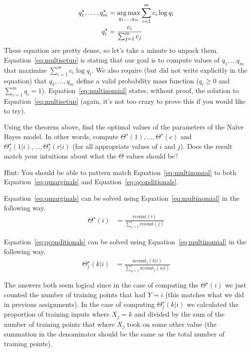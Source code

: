\documentclass[assignment04_Solutions]{subfiles}
\begin{document}
\begin{exercise}[(60 minutes)]
\begin{align}
q^\star_1, \ldots, q^\star_m &= \operatorname*{arg\,max}_{q_1, \ldots, q_m} \sum_{i=1}^m c_i \log q_i \label{eq:multisetup} \\
q^\star_i &= \frac{c_i}{\sum_{j=1}^m c_j} \label{eq:multinomial}
\end{align}
These equation are pretty dense, so let's take a minute to unpack them.  Equation~\ref{eq:multisetup} is stating that our goal is to compute values of $q_1, \ldots q_m$ that maximize $\sum_{i=1}^m c_i \log q_i$.  We also require (but did not write explicitly in the equation) that $q_1, \ldots, q_m$ define a valid probability mass function ($q_i \geq 0$ and $\sum_{i=1}^m q_i = 1$).  Equation~\ref{eq:multinomial} states, without proof, the solution to Equation~\ref{eq:multisetup} (again, it's not too crazy to prove this if you would like to try).

Using the theorem above, find the optimal values of the parameters of the Na\"ive Bayes model.  In other words, compute $\Theta^\star(1), \ldots, \Theta^\star(c)$ and $\Theta_j^\star(1|i), \ldots, \Theta^\star_j(r|i)$ (for all appropriate values of $i$ and $j$).  Does the result match your intuitions about what the $\Theta$ values should be?

Hint: You should be able to pattern match Equation~\ref{eq:multinomial} to both Equation~\ref{eq:qmarginals} and Equation~\ref{eq:qconditionals}. 

\begin{boxedsolution}
Equation~\ref{eq:qmarginals} can be solved using Equation~\ref{eq:multinomial} in the following way.
\begin{align}
\Theta^\star(i) &= \frac{\mbox{ycount}(i)}{\sum_{j=1}^c \mbox{ycount}(j)}
\end{align}

Equation~\ref{eq:qconditionals} can be solved using Equation~\ref{eq:multinomial} in the following way.
\begin{align}
\Theta_j^\star(k|i) &= \frac{\mbox{xcount}_j(k|i)}{\sum_{u=1}^r \mbox{xcount}_j(u|i)}
\end{align}

The answers both seem logical since in the case of computing the $\Theta^\star(i)$ we just counted the number of training points that had $Y=i$ (this matches what we did in previous assignments).  In the case of computing $\Theta^\star_j(k|i)$ we calculated the proportion of training inputs where $X_j = k$ and divided by the sum of the number of training points that where $X_j$ took on some other value (the summation in the denominator should be the same as the total number of training points).
\end{boxedsolution}
\ees
\end{exercise}
\end{document}
